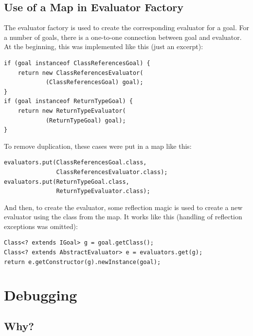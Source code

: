 \documentclass[12pt,halfparskip,DIV11,BCOR10mm]{scrreprt}
\begin{document}

\subsection{Use of a Map in Evaluator Factory}



The evaluator factory is used to create the corresponding evaluator for a goal. For a number of goals, there is a one-to-one connection between goal and evaluator. At the beginning, this was implemented like this (just an excerpt):

\begin{lstlisting}[style=java]
if (goal instanceof ClassReferencesGoal) {
    return new ClassReferencesEvaluator(
            (ClassReferencesGoal) goal);
}
if (goal instanceof ReturnTypeGoal) {
    return new ReturnTypeEvaluator(
            (ReturnTypeGoal) goal);
}
\end{lstlisting}

To remove duplication, these cases were put in a map like this:

\begin{lstlisting}[style=java]
evaluators.put(ClassReferencesGoal.class,
               ClassReferencesEvaluator.class);
evaluators.put(ReturnTypeGoal.class,
               ReturnTypeEvaluator.class);
\end{lstlisting}

And then, to create the evaluator, some reflection magic is used to create a new evaluator using the class from the map. It works like this (handling of reflection exceptions was omitted):

\begin{lstlisting}[style=java]
Class<? extends IGoal> g = goal.getClass();
Class<? extends AbstractEvaluator> e = evaluators.get(g);
return e.getConstructor(g).newInstance(goal);
\end{lstlisting}


\section{Debugging}

\subsection{Why?}
\end{document}
